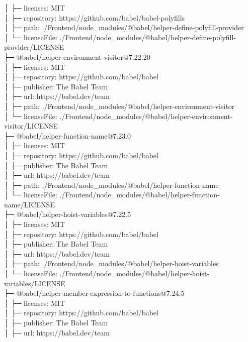 │  ├─ licenses: MIT\\
│  ├─ repository: https://github.com/babel/babel-polyfills\\
│  ├─ path: ./Frontend/node\_modules/@babel/helper-define-polyfill-provider\\
│  └─ licenseFile: ./Frontend/node\_modules/@babel/helper-define-polyfill-provider/LICENSE\\
├─ @babel/helper-environment-visitor@7.22.20\\
│  ├─ licenses: MIT\\
│  ├─ repository: https://github.com/babel/babel\\
│  ├─ publisher: The Babel Team\\
│  ├─ url: https://babel.dev/team\\
│  ├─ path: ./Frontend/node\_modules/@babel/helper-environment-visitor\\
│  └─ licenseFile: ./Frontend/node\_modules/@babel/helper-environment-visitor/LICENSE\\
├─ @babel/helper-function-name@7.23.0\\
│  ├─ licenses: MIT\\
│  ├─ repository: https://github.com/babel/babel\\
│  ├─ publisher: The Babel Team\\
│  ├─ url: https://babel.dev/team\\
│  ├─ path: ./Frontend/node\_modules/@babel/helper-function-name\\
│  └─ licenseFile: ./Frontend/node\_modules/@babel/helper-function-name/LICENSE\\
├─ @babel/helper-hoist-variables@7.22.5\\
│  ├─ licenses: MIT\\
│  ├─ repository: https://github.com/babel/babel\\
│  ├─ publisher: The Babel Team\\
│  ├─ url: https://babel.dev/team\\
│  ├─ path: ./Frontend/node\_modules/@babel/helper-hoist-variables\\
│  └─ licenseFile: ./Frontend/node\_modules/@babel/helper-hoist-variables/LICENSE\\
├─ @babel/helper-member-expression-to-functions@7.24.5\\
│  ├─ licenses: MIT\\
│  ├─ repository: https://github.com/babel/babel\\
│  ├─ publisher: The Babel Team\\
│  ├─ url: https://babel.dev/team\\
